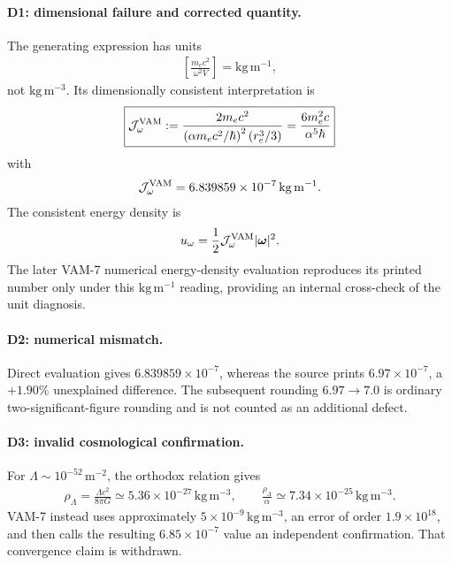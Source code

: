 \paragraph{D1: dimensional failure and corrected quantity.}
The generating expression has units
\begin{align}
    \left[
    \frac{m_ec^2}{\omega^2V}
    \right]
    =
    \mathrm{kg\,m^{-1}},
\end{align}
not \(\mathrm{kg\,m^{-3}}\).  Its dimensionally consistent interpretation is
\begin{align}
    \boxed{
    \mathcal J_{\omega}^{\rm VAM}
    :=
    \frac{2m_ec^2}{
        \left(\alpha m_ec^2/\hbar\right)^2
        \left(r_e^3/3\right)}
    =
    \frac{6m_e^2c}{\alpha^5\hbar}
    }
    \label{eq:rt_vam7_historical_microinertia}
\end{align}
with
\begin{align}
    \mathcal J_{\omega}^{\rm VAM}
    =
    6.839859\times10^{-7}\,\mathrm{kg\,m^{-1}}.
\end{align}
The consistent energy density is
\begin{align}
    u_\omega
    =
    \frac12\mathcal J_{\omega}^{\rm VAM}
    |\boldsymbol\omega|^2.
\end{align}
The later VAM-7 numerical energy-density evaluation reproduces its printed
number only under this \(\mathrm{kg\,m^{-1}}\) reading, providing an internal
cross-check of the unit diagnosis.

\paragraph{D2: numerical mismatch.}
Direct evaluation gives
\(6.839859\times10^{-7}\), whereas the source prints
\(6.97\times10^{-7}\), a \(+1.90\%\) unexplained difference.  The subsequent
rounding \(6.97\to7.0\) is ordinary two-significant-figure rounding and is not
counted as an additional defect.

\paragraph{D3: invalid cosmological confirmation.}
For \(\Lambda\sim10^{-52}\,\mathrm{m^{-2}}\), the orthodox relation gives
\begin{align}
    \rho_\Lambda
    =
    \frac{\Lambda c^2}{8\pi G}
    \simeq
    5.36\times10^{-27}\,\mathrm{kg\,m^{-3}},
    \qquad
    \frac{\rho_\Lambda}{\alpha}
    \simeq
    7.34\times10^{-25}\,\mathrm{kg\,m^{-3}}.
\end{align}
VAM-7 instead uses approximately
\(5\times10^{-9}\,\mathrm{kg\,m^{-3}}\), an error of order
\(1.9\times10^{18}\), and then calls the resulting
\(6.85\times10^{-7}\) value an independent confirmation.  That convergence
claim is withdrawn.

